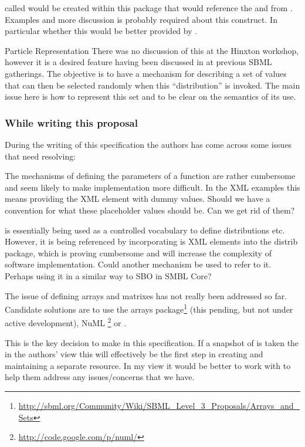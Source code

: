 \documentclass[draftspec]{sbmlpkgspec}
\begin{document}
\begin{description}
  called  would be created within this package that
  would reference the  and  from
  \uncertml. Examples and more discussion is probably required about
  this construct. In particular whether this would be better provided
  by \uncertml.
\item{Particle Representation} There was no discussion of this at the
  Hinxton workshop, however it is a desired feature having been
  discussed in at previous SBML gatherings. The objective is to have a
  mechanism for describing a set of values that can then be selected
  randomly when this ``distribution'' is invoked. The main issue here
  is how to represent this set and to be clear on the semantics of its use.
\end{description}

\subsubsection*{While writing this proposal}

During the writing of this specification the authors has come across
some issues that need resolving:

\begin{description}
\item[Distribution function parameters] The mechanisms of defining the
  parameters of a function are rather cumbersome and seem likely to
  make implementation more difficult. In the XML examples this means
  providing the \uncertml XML element with dummy values. Should we
  have a convention for what these placeholder values should be. Can
  we get rid of them?
\item[\uncertml is a Controlled Vocabulary] \uncertml is essentially
  being used as a controlled vocabulary to define distributions
  etc. However, it is being referenced by incorporating is XML
  elements into the distrib package, which is proving cumbersome and
  will increase the complexity of software implementation. Could
  another mechanism be used to refer to it. Perhaps using it in a
  similar way to SBO in SMBL Core?
\item The issue of defining arrays and matrixes has not really been
  addressed so far. Candidate solutions are to use the arrays package\footnote{\url{http://sbml.org/Community/Wiki/SBML_Level_3_Proposals/Arrays_and_Sets}}
  (this pending, but not under active development), NuML
  \footnote{\url{http://code.google.com/p/numl/}} or \mathml.
\item[\uncertml to snapshot or not] This is the key decision to make
  in this specification. If a snapshot of \uncertml is taken the in
  the authors' view this will effectively be the first step in
  creating and maintaining a separate resource. In my view it would be
  better to work with \uncertml to help them address any
  issues/concerns that we have.
\end{description}
\end{document}

